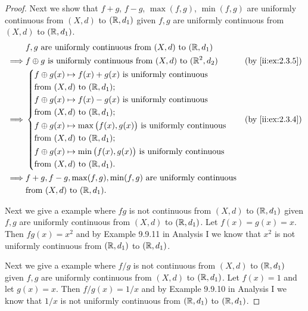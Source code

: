 \begin{proof}
  Next we show that \(f + g\), \(f - g\), \(\max(f, g)\), \(\min(f, g)\) are uniformly continuous from \((X, d)\) to \((\mathbb{R}, d_1)\) given \(f, g\) are uniformly continuous from \((X, d)\) to \((\mathbb{R}, d_1)\).
  \begin{align*}
             & f, g \text{ are uniformly continuous from } (X, d) \text{ to } (\R, d_1)                             \\
    \implies & f \oplus g \text{ is uniformly continuous from } (X, d) \text{ to } (\R^2, d_2)   &  & \by{ii:ex:2.3.5} \\
    \implies & \begin{dcases}
                 f \oplus g(x) \mapsto f(x) + g(x) \text{ is uniformly continuous}              \\
                 \text{from } (X, d) \text{ to } (\R, d_1);                                     \\
                 f \oplus g(x) \mapsto f(x) - g(x) \text{ is uniformly continuous}              \\
                 \text{from } (X, d) \text{ to } (\R, d_1);                                     \\
                 f \oplus g(x) \mapsto \max\big(f(x), g(x)\big) \text{ is uniformly continuous} \\
                 \text{from } (X, d) \text{ to } (\R, d_1);                                     \\
                 f \oplus g(x) \mapsto \min\big(f(x), g(x)\big) \text{ is uniformly continuous} \\
                 \text{from } (X, d) \text{ to } (\R, d_1).
               \end{dcases} &  & \by{ii:ex:2.3.4}                       \\
    \implies & f + g, f - g, \max(f, g), \min(f, g) \text{ are uniformly continuous}                                \\
             & \text{from } (X, d) \text{ to } (\R, d_1).
  \end{align*}

  Next we give a example where \(fg\) is not continuous from \((X, d)\) to \((\mathbb{R}, d_1)\) given \(f, g\) are uniformly continuous from \((X, d)\) to \((\mathbb{R}, d_1)\).
  Let \(f(x) = g(x) = x\).
  Then \(fg(x) = x^2\) and by Example 9.9.11 in Analysis I we know that \(x^2\) is not uniformly continuous from \((\mathbb{R}, d_1)\) to \((\mathbb{R}, d_1)\).

  Next we give a example where \(f / g\) is not continuous from \((X, d)\) to \((\mathbb{R}, d_1)\) given \(f, g\) are uniformly continuous from \((X, d)\) to \((\mathbb{R}, d_1)\).
  Let \(f(x) = 1\) and let \(g(x) = x\).
  Then \(f / g(x) = 1 / x\) and by Example 9.9.10 in Analysis I we know that \(1 / x\) is not uniformly continuous from \((\mathbb{R}, d_1)\) to \((\mathbb{R}, d_1)\).


\end{proof}
